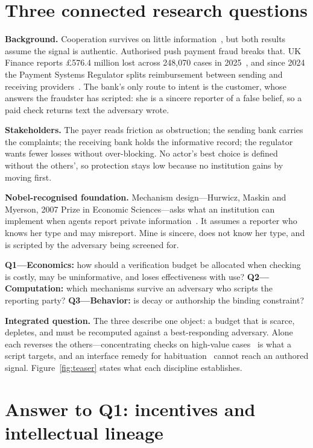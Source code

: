 \section{Three connected research questions}

\textbf{Background.} Cooperation survives on little
information~\cite{morozov2026,leung2026}, but both results assume the
signal is authentic. Authorised push payment fraud breaks that. UK Finance
reports \pounds576.4 million lost across 248{,}070 cases in
2025~\cite{ukfinance2026}, and since 2024 the Payment Systems Regulator
splits reimbursement between sending and receiving
providers~\cite{psr2024}. The bank's only route to intent is the customer,
whose answers the fraudster has scripted: she is a sincere reporter of a
false belief, so a paid check returns text the adversary wrote.

\textbf{Stakeholders.} The payer reads friction as obstruction; the
sending bank carries the complaints; the receiving bank holds the
informative record; the regulator wants fewer losses without
over-blocking. No actor's best choice is defined without the others', so
protection stays low because no institution gains by moving first.

\textbf{Nobel-recognised foundation.} Mechanism design---Hurwicz, Maskin
and Myerson, 2007 Prize in Economic Sciences---asks what an institution
can implement when agents report private
information~\cite{myerson1981}. It assumes a reporter who knows her type
and may misreport. Mine is sincere, does not know her type, and is
scripted by the adversary being screened for.

\textbf{Q1---Economics:} how should a verification budget be allocated
when checking is costly, may be uninformative, and loses effectiveness
with use? \textbf{Q2---Computation:} which mechanisms survive an adversary
who scripts the reporting party? \textbf{Q3---Behavior:} is decay or
authorship the binding constraint?

\textbf{Integrated question.} The three describe one object: a budget that
is scarce, depletes, and must be recomputed against a best-responding
adversary. Alone each reverses the others---concentrating checks on
high-value cases~\cite{benporath2014} is what a script targets, and an
interface remedy for habituation~\cite{anderson2016} cannot reach an
authored signal. Figure~\ref{fig:teaser} states what each discipline
establishes.

\section{Answer to Q1: incentives and intellectual lineage}

